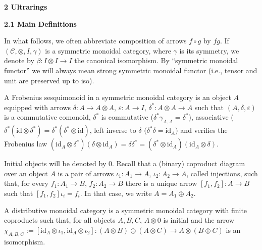
 
\par\medskip\noindent\textbf{2 Ultrarings}\par
 
 
\par\medskip\noindent\textbf{2.1 Main Definitions}\par
 
 
In what follows, we often abbreviate composition of arrows $f\circ g$ by $fg$. If $(\mathcal{C},\otimes,I,\gamma)$ is a symmetric monoidal category, where $\gamma$ is its symmetry, we denote by $\beta:I\otimes I\to I$ the canonical isomorphism. By “symmetric monoidal functor” we will always mean strong symmetric monoidal functor (i.e., tensor and unit are preserved up to iso).\par
 
 
 
A Frobenius sesquimonoid in a symmetric monoidal category is an object $A$ equipped with arrows $\delta:A\to A\otimes A$, $\varepsilon:A\to I$, $\delta^{\ast}:A\otimes A\to A$ such that $(A,\delta,\varepsilon)$ is a commutative comonoid, $\delta^{\ast}$ is commutative ($\delta^{\ast}\gamma_{A,A}=\delta^{\ast}$), associative ($\delta^{\ast}(\mathrm{id}\otimes\delta^{\ast})=\delta^{\ast}(\delta^{\ast}%
\otimes\mathrm{id})$, left inverse to $\delta$ ($\delta^{\ast}\delta=\mathrm{id}_{A}$) and verifies the Frobenius law $(\mathrm{id}_{A}\otimes\delta^{\ast})(\delta\otimes\mathrm{id}_{A})=\delta%
\delta^{\ast}=(\delta^{\ast}\otimes\mathrm{id}_{A})(\mathrm{id}_{A}\otimes\delta)$.\par
 
 
 
Initial objects will be denoted by $0$. Recall that a (binary) coproduct diagram over an object $A$ is a pair of arrows $\iota_{1}:A_{1}\to A$, $\iota_{2}:A_{2}\to A$, called injections, such that, for every $f_{1}:A_{1}\to B$, $f_{2}:A_{2}\to B$ there is a unique arrow $[f_{1},f_{2}]:A\to B$ such that $[f_{1},f_{2}]\iota_{i}=f_{i}$. In that case, we write $A=A_{1}\oplus A_{2}$.\par
 
 
 
A distributive monoidal category is a symmetric monoidal category with finite coproducts such that, for all objects $A,B,C$, $A\otimes 0$ is initial and the arrow $\chi_{A,B,C}:=[\mathrm{id}_{A}\otimes\iota_{1},\mathrm{id}_{A}\otimes\iota_{2}%
]:(A\otimes B)\oplus(A\otimes C)\to A\otimes(B\oplus C)$ is an isomorphism.\par
 
